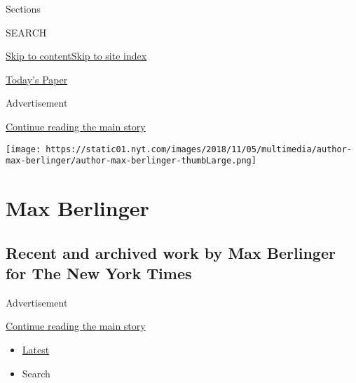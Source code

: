 Sections

SEARCH

\protect\hyperlink{site-content}{Skip to
content}\protect\hyperlink{site-index}{Skip to site index}

\href{https://myaccount.nytimes.com/auth/login?response_type=cookie\&client_id=vi}{}

\href{https://www.nytimes.com/section/todayspaper}{Today's Paper}

Advertisement

\protect\hyperlink{after-top}{Continue reading the main story}

\texttt{[image: https://static01.nyt.com/images/2018/11/05/multimedia/author-max-berlinger/author-max-berlinger-thumbLarge.png]}

\hypertarget{max-berlinger}{%
\section{Max Berlinger}\label{max-berlinger}}

\hypertarget{recent-and-archived-work-by-max-berlinger-for-the-new-york-times}{%
\subsection{Recent and archived work by Max Berlinger for The New York
Times}\label{recent-and-archived-work-by-max-berlinger-for-the-new-york-times}}

Advertisement

\protect\hyperlink{after-mid1}{Continue reading the main story}

\begin{itemize}
\tightlist
\item
  \protect\hyperlink{stream-panel}{Latest}
\item
  Search
\end{itemize}

